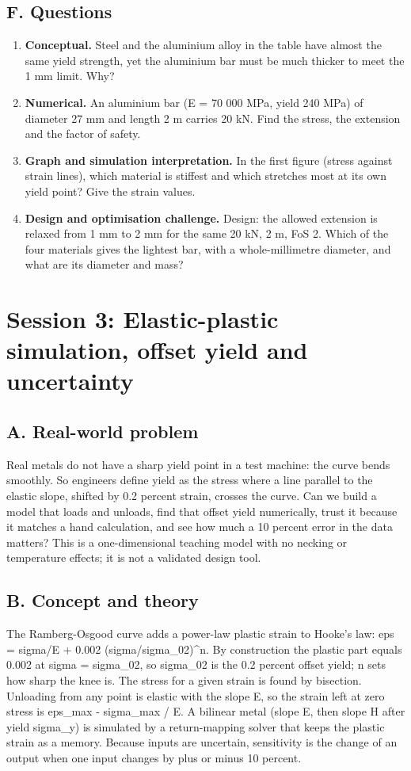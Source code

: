 \documentclass[11pt,a4paper]{article}
\begin{document}
\subsection*{F. Questions}
\begin{enumerate}[nosep]
\item \textbf{Conceptual.} Steel and the aluminium alloy in the table have almost the same yield strength, yet the aluminium bar must be much thicker to meet the 1 mm limit. Why?
\item \textbf{Numerical.} An aluminium bar (E = 70 000 MPa, yield 240 MPa) of diameter 27 mm and length 2 m carries 20 kN. Find the stress, the extension and the factor of safety.
\item \textbf{Graph and simulation interpretation.} In the first figure (stress against strain lines), which material is stiffest and which stretches most at its own yield point? Give the strain values.
\item \textbf{Design and optimisation challenge.} Design: the allowed extension is relaxed from 1 mm to 2 mm for the same 20 kN, 2 m, FoS 2. Which of the four materials gives the lightest bar, with a whole-millimetre diameter, and what are its diameter and mass?
\end{enumerate}

\section{Session 3: Elastic-plastic simulation, offset yield and uncertainty}

\subsection*{A. Real-world problem}
Real metals do not have a sharp yield point in a test machine: the curve bends smoothly. So engineers define yield as the stress where a line parallel to the elastic slope, shifted by 0.2 percent strain, crosses the curve. Can we build a model that loads and unloads, find that offset yield numerically, trust it because it matches a hand calculation, and see how much a 10 percent error in the data matters? This is a one-dimensional teaching model with no necking or temperature effects; it is not a validated design tool.

\subsection*{B. Concept and theory}
The Ramberg-Osgood curve adds a power-law plastic strain to Hooke's law: eps = sigma/E + 0.002 (sigma/sigma\_02)\textasciicircum{}n. By construction the plastic part equals 0.002 at sigma = sigma\_02, so sigma\_02 is the 0.2 percent offset yield; n sets how sharp the knee is. The stress for a given strain is found by bisection. Unloading from any point is elastic with the slope E, so the strain left at zero stress is eps\_max - sigma\_max / E. A bilinear metal (slope E, then slope H after yield sigma\_y) is simulated by a return-mapping solver that keeps the plastic strain as a memory. Because inputs are uncertain, sensitivity is the change of an output when one input changes by plus or minus 10 percent.
\end{document}
